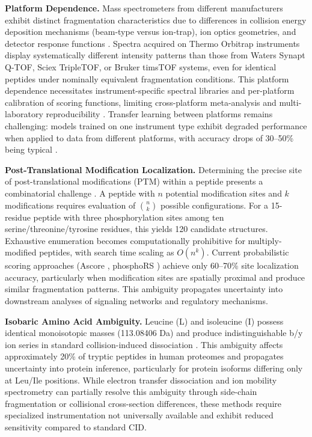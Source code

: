 \documentclass[11pt,twocolumn]{article}
\newcommand{\PTM}{PTM}
\begin{document}
\textbf{Platform Dependence.} Mass spectrometers from different manufacturers exhibit distinct fragmentation characteristics due to differences in collision energy deposition mechanisms (beam-type versus ion-trap), ion optics geometries, and detector response functions \cite{tabb2010reliability}. Spectra acquired on Thermo Orbitrap instruments display systematically different intensity patterns than those from Waters Synapt Q-TOF, Sciex TripleTOF, or Bruker timsTOF systems, even for identical peptides under nominally equivalent fragmentation conditions. This platform dependence necessitates instrument-specific spectral libraries and per-platform calibration of scoring functions, limiting cross-platform meta-analysis and multi-laboratory reproducibility \cite{collins2017multi}. Transfer learning between platforms remains challenging: models trained on one instrument type exhibit degraded performance when applied to data from different platforms, with accuracy drops of 30--50\% being typical \cite{gessulat2019prosit}.

\textbf{Post-Translational Modification Localization.} Determining the precise site of post-translational modifications (\PTM{}) within a peptide presents a combinatorial challenge \cite{beausoleil2006probability}. A peptide with $n$ potential modification sites and $k$ modifications requires evaluation of $\binom{n}{k}$ possible configurations. For a 15-residue peptide with three phosphorylation sites among ten serine/threonine/tyrosine residues, this yields 120 candidate structures. Exhaustive enumeration becomes computationally prohibitive for multiply-modified peptides, with search time scaling as $O(n^k)$. Current probabilistic scoring approaches (Ascore \cite{taus2011ascore}, phosphoRS \cite{taus2011phosphors}) achieve only 60--70\% site localization accuracy, particularly when modification sites are spatially proximal and produce similar fragmentation patterns. This ambiguity propagates uncertainty into downstream analyses of signaling networks and regulatory mechanisms.

\textbf{Isobaric Amino Acid Ambiguity.} Leucine (L) and isoleucine (I) possess identical monoisotopic masses (113.08406 Da) and produce indistinguishable b/y ion series in standard collision-induced dissociation \cite{armirotti2007leu}. This ambiguity affects approximately 20\% of tryptic peptides in human proteomes and propagates uncertainty into protein inference, particularly for protein isoforms differing only at Leu/Ile positions. While electron transfer dissociation \cite{xiao2016high} and ion mobility spectrometry \cite{forsythe2020calibration} can partially resolve this ambiguity through side-chain fragmentation or collisional cross-section differences, these methods require specialized instrumentation not universally available and exhibit reduced sensitivity compared to standard CID.
\end{document}
